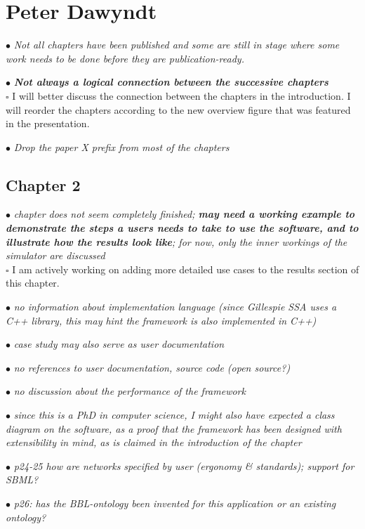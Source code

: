 \documentclass[10pt]{article}
\newcommand{\todo}{$\square$}
\newcommand{\exam}[2][\  ]{\hspace{0pt}\marginpar{\color{myred}#1}$\bullet$ \textit{#2}}
\newcommand{\imp}[1]{\textbf{#1}}
\newcommand{\task}[2][\todo]{{\color{myblue} #1 #2}}
\newcommand{\bigexclaim}{\raisebox{-0.1em}{\BigTriangleUp}\hspace{-0.32em}\llap{\small\textbf{!}}\hspace{0.32em}}
\newcommand{\tagimp}{\bigexclaim}
\newcommand{\tagtime}{{\Large $\hourglass$}}
\begin{document}
\section{Peter Dawyndt}

\exam{Not all chapters have been published and some are still in stage where some work needs to be done before they are publication-ready. }

\exam{\imp{Not always a logical connection between the successive chapters}} \\
\task{I will better discuss the connection between the chapters in the introduction. I will reorder the chapters according to the new overview figure that was featured in the presentation.}

\exam{Drop the paper X prefix from most of the chapters}

\subsection{Chapter 2}


\exam[\tagimp \tagtime]{chapter does not seem completely finished; \imp{may need a working example to demonstrate the steps
	a users needs to take to use the software, and to illustrate how the results look like}; for now, only
	the inner workings of the simulator are discussed} \\
\task{I am actively working on adding more detailed use cases to the results section of this chapter.}

\exam{no information about implementation language
	(since Gillespie SSA uses a C++ library, this may hint the framework is also implemented in C++)}

\exam{case
	study may also serve as user documentation}

\exam{no references to user documentation, source code
	(open source?)}

\exam{no discussion about the performance of the framework}

\exam[\tagtime]{since this is a PhD in
	computer science, I might also have expected a class diagram on the software, as a proof that the
	framework has been designed with extensibility in mind, as is claimed in the introduction of the chapter}

\exam{p24-25 how are networks specified by user (ergonomy \& standards); support for SBML?}

\exam{p26: has the BBL-ontology been invented for this application or an existing ontology?}
\end{document}
